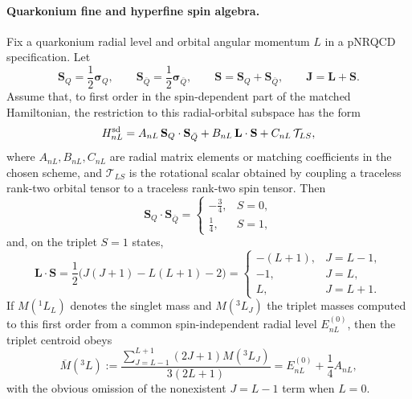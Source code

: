 \paragraph{Quarkonium fine and hyperfine spin algebra.}
Fix a quarkonium radial level and orbital angular momentum \(L\) in a
pNRQCD specification.  Let
\[
  \mathbf S_Q=\frac12\boldsymbol\sigma_Q,\qquad
  \mathbf S_{\bar Q}=\frac12\boldsymbol\sigma_{\bar Q},\qquad
  \mathbf S=\mathbf S_Q+\mathbf S_{\bar Q},\qquad
  \mathbf J=\mathbf L+\mathbf S .
\]
Assume that, to first order in the spin-dependent part of the matched
Hamiltonian, the restriction to this radial-orbital subspace has the form
\begin{equation}
  H_{nL}^{\rm sd}
  =
  A_{nL}\,\mathbf S_Q\cdot\mathbf S_{\bar Q}
  +
  B_{nL}\,\mathbf L\cdot\mathbf S
  +
  C_{nL}\,\mathcal T_{LS},
  \label{eq:qcd-quarkonium-spin-dependent-hamiltonian}
\end{equation}
where \(A_{nL},B_{nL},C_{nL}\) are radial matrix elements or matching
coefficients in the chosen scheme, and \(\mathcal T_{LS}\) is the rotational
scalar obtained by coupling a traceless rank-two orbital tensor to a
traceless rank-two spin tensor.  Then
\begin{equation}
  \mathbf S_Q\cdot\mathbf S_{\bar Q}
  =
  \begin{cases}
  -\frac34, & S=0,\\[2mm]
  \frac14, & S=1,
  \end{cases}
  \label{eq:qcd-quarkonium-spin-spin-eigenvalues}
\end{equation}
and, on the triplet \(S=1\) states,
\begin{equation}
  \mathbf L\cdot\mathbf S
  =
  \frac12\bigl(J(J+1)-L(L+1)-2\bigr)
  =
  \begin{cases}
  -(L+1), & J=L-1,\\
  -1, & J=L,\\
  L, & J=L+1 .
  \end{cases}
  \label{eq:qcd-quarkonium-spin-orbit-eigenvalues}
\end{equation}
If \(M(^1L_L)\) denotes the singlet mass and \(M(^3L_J)\) the triplet masses
computed to this first order from a common spin-independent radial level
\(E_{nL}^{(0)}\), then the triplet centroid obeys
\begin{equation}
  \overline M(^3L)
  :=
  \frac{\sum_{J=L-1}^{L+1}(2J+1)M(^3L_J)}{3(2L+1)}
  =
  E_{nL}^{(0)}+\frac14 A_{nL},
  \label{eq:qcd-quarkonium-triplet-centroid}
\end{equation}
with the obvious omission of the nonexistent \(J=L-1\) term when \(L=0\).
